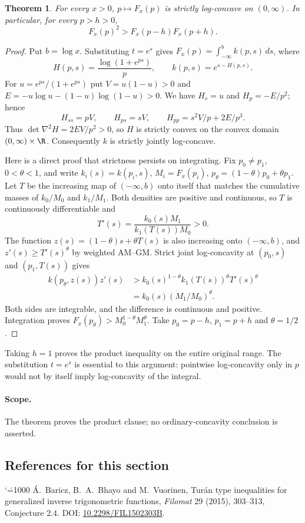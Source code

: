\documentclass[11pt,a4paper]{article}
\makeatletter
\numberwithin{equation}{section}
\newtheorem{thm}[theorem]{Theorem}
\theoremstyle{definition}
\theoremstyle{remark}
\renewenvironment{thebibliography}[1]
 {\subsection*{References for this section}\small
  \list{\@biblabel{\@arabic\c@enumiv}}
       {\settowidth\labelwidth{\@biblabel{#1}}\leftmargin\labelwidth
        \advance\leftmargin\labelsep\@openbib@code
        \usecounter{enumiv}\let\p@enumiv\@empty
        \renewcommand\theenumiv{\@arabic\c@enumiv}}
  \sloppy\clubpenalty4000\widowpenalty4000\sfcode`\.=1000\relax}
 {\def\@noitemerr{\@latex@warning{Empty bibliography}}\endlist}
\makeatother
\begin{document}
\begin{thm} For every $x>0$, $p\mapsto F_x(p)$ is strictly log-concave on $(0,\infty)$. In particular, for every $p>h>0$,
\[
 F_x(p)^2>F_x(p-h)F_x(p+h).
\]
\end{thm}
\begin{proof}
Put $b=\log x$. Substituting $t=e^s$ gives $F_x(p)=\int_{-\infty}^b k(p,s)\,ds$, where
\[
 H(p,s)=\frac{\log(1+e^{ps})}{p},\qquad k(p,s)=e^{s-H(p,s)} .
\]
For $u=e^{ps}/(1+e^{ps})$ put $V=u(1-u)>0$ and $E=-u\log u-(1-u)\log(1-u)>0$. We have $H_s=u$ and $H_p=-E/p^2$; hence
\[
 H_{ss}=pV,\qquad H_{ps}=sV,\qquad H_{pp}=s^2V/p+2E/p^3.
\]
Thus $\det\nabla^2H=2EV/p^2>0$, so $H$ is strictly convex on the convex domain $(0,\infty)\times\R$. Consequently $k$ is strictly jointly log-concave.

Here is a direct proof that strictness persists on integrating. Fix $p_0\ne p_1$, $0<\theta<1$, and write $k_i(s)=k(p_i,s)$, $M_i=F_x(p_i)$, $p_\theta=(1-\theta)p_0+\theta p_1$. Let $T$ be the increasing map of $(-\infty,b)$ onto itself that matches the cumulative masses of $k_0/M_0$ and $k_1/M_1$. Both densities are positive and continuous, so $T$ is continuously differentiable and
\[
 T'(s)=\frac{k_0(s)M_1}{k_1(T(s))M_0}>0.
\]
The function $z(s)=(1-\theta)s+\theta T(s)$ is also increasing onto $(-\infty,b)$, and $z'(s)\ge T'(s)^\theta$ by weighted AM--GM. Strict joint log-concavity at $(p_0,s)$ and $(p_1,T(s))$ gives
\[
 \begin{aligned}
 k(p_\theta,z(s))z'(s)
 &>k_0(s)^{1-\theta}k_1(T(s))^\theta T'(s)^\theta\\
 &=k_0(s)(M_1/M_0)^\theta .
 \end{aligned}
\]
Both sides are integrable, and the difference is continuous and positive. Integration proves $F_x(p_\theta)>M_0^{1-\theta}M_1^\theta$. Take $p_0=p-h$, $p_1=p+h$ and $\theta=1/2$.
\end{proof}
Taking $h=1$ proves the product inequality on the entire original range. The substitution $t=e^s$ is essential to this argument: pointwise log-concavity only in $p$ would not by itself imply log-concavity of the integral.

\paragraph{Scope.} The theorem proves the product clause; no ordinary-concavity conclusion is asserted.

\begin{thebibliography}{9}
 \'A.~Baricz, B.~A.~Bhayo and M.~Vuorinen, Tur\'an type inequalities for generalized inverse trigonometric functions, \emph{Filomat} 29 (2015), 303--313, Conjecture 2.4. DOI: \url{10.2298/FIL1502303B}.
\end{thebibliography}
\end{document}

